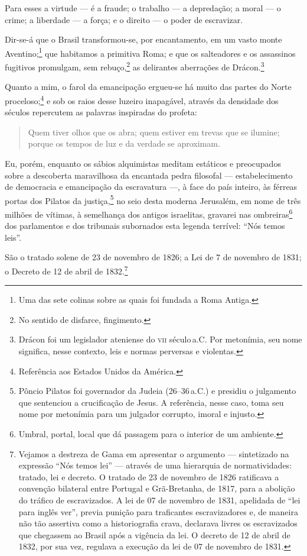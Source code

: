 Para esses a virtude --- é a fraude; o trabalho --- a depredação; a moral
--- o crime; a liberdade --- a força; e o direito --- o poder de
escravizar.

Dir-se-á que o Brasil transformou-se, por encantamento, em um vasto
monte Aventino;\footnote{Uma das sete colinas sobre as quais foi
  fundada a Roma Antiga.} que habitamos a primitiva Roma; e que os
salteadores e os assassinos fugitivos promulgam, sem rebuço,\footnote{
  No sentido de disfarce, fingimento.} as delirantes aberrações de
Drácon.\footnote{Drácon foi um legislador ateniense do \textsc{vii} século\,a.C. Por metonímia, seu nome significa, nesse
  contexto, leis e normas perversas e violentas.}

Quanto a mim, o farol da emancipação ergueu-se há muito das partes do
Norte proceloso;\footnote{Referência aos Estados Unidos da América.} e
sob os raios desse luzeiro inapagável, através da densidade dos séculos
repercutem as palavras inspiradas do profeta:

\begin{quote}
Quem tiver olhos que os abra; quem estiver em trevas que se ilumine;
porque os tempos de luz e da verdade se aproximam.
\end{quote}

Eu, porém, enquanto os sábios alquimistas meditam estáticos e
preocupados sobre a descoberta maravilhosa da encantada pedra filosofal
--- estabelecimento de democracia e emancipação da escravatura ---, à face
do país inteiro, às férreas portas dos Pilatos da justiça,\footnote{
  Pôncio Pilatos foi governador da Judeia (26--36\,a.C.) e presidiu o
  julgamento que sentenciou a crucificação de Jesus. A referência, nesse
  caso, toma seu nome por metonímia para um julgador corrupto, imoral e
  injusto.} no seio desta moderna Jerusalém, em nome de três milhões de
vítimas, à semelhança dos antigos israelitas, gravarei nas
ombreiras\footnote{Umbral, portal, local que dá passagem para o
  interior de um ambiente.} dos parlamentos e dos tribunais subornados
esta legenda terrível: ``Nós temos leis''.

São o tratado solene de 23 de novembro de 1826; a Lei de 7 de novembro
de 1831; o Decreto de 12 de abril de 1832.\footnote{Vejamos a destreza
  de Gama em apresentar o argumento --- sintetizado na expressão ``Nós
  temos lei'' --- através de uma hierarquia de normatividades: tratado,
  lei e decreto. O tratado de 23 de novembro de 1826 ratificava a convenção
  bilateral entre Portugal e Grã-Bretanha, de 1817, para a abolição do
  tráfico de escravizados. A lei de 07 de novembro de 1831, apelidada de ``lei para
  inglês ver'', previa punição para traficantes escravizadores e, de\label{1831}
  maneira não tão assertiva como a historiografia crava, declarava
  livres os escravizados que chegassem ao Brasil após a vigência da lei.
  O decreto de 12 de abril de 1832, por sua vez, regulava a execução da lei de
  07 de novembro de 1831.}

